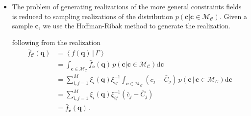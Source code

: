 \documentclass[a4paper, 11pt]{article}
\begin{document}
\begin{itemize}
\item
The problem of generating realizations of the more general constraints fields is reduced to sampling realizations of the distribution $p(\bm{c}|\bm{c}\in \mathcal{M}_\mathcal{C})$. Given a sample $\bm{c}$, we use the Hoffman-Ribak method to generate the realization.


following from the realization  
\begin{align}
\bar{f}_{\mathcal{C}}(\bm{q}) 
&=\left\langle f(\bm{q})\,|\,\Gamma\right \rangle \nonumber\\
&= \int_{\bm{c} \in \mathcal{M}_{\mathcal{C}}} \bar{f}_{\bm{c}}(\bm{q})\, p(\bm{c}|\bm{c}\in \mathcal{M}_{\mathcal{C}}) \mathrm{d}\bm{c}\nonumber\\
&= \sum_{i,j=1}^M\xi_i(\bm{q}) \xi_{ij}^{-1}\int_{\bm{c} \in \mathcal{M}_{\mathcal{C}}}  (c_j-\bar{C}_j)\, p(\bm{c}\,|\,\bm{c}\in \mathcal{M}_{\mathcal{C}}) \mathrm{d}\bm{c}\nonumber\\
&= \sum_{i,j=1}^M \xi_i(\bm{q}) \xi_{ij}^{-1} (\bar{c}_j-\bar{C}_j)\nonumber\\
&= \bar{f}_{\bar{\bm{c}}}(\bm{q})\,.
\end{align}


\end{itemize}
\end{document}
